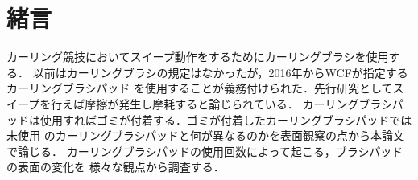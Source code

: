 \documentclass[main]{subfiles}
\begin{document}
\chapter{緒言}
カーリング競技においてスイープ動作をするためにカーリングブラシを使用する．
以前はカーリングブラシの規定はなかったが，2016年からWCFが指定するカーリングブラシパッド
を使用することが義務付けられた．先行研究としてスイープを行えば摩擦が発生し摩耗すると論じられている\cite{ref:maeno2016}．
カーリングブラシパッドは使用すればゴミが付着する．ゴミが付着したカーリングブラシパッドでは未使用
のカーリングブラシパッドと何が異なるのかを表面観察の点から本論文で論じる． 
カーリングブラシパッドの使用回数によって起こる，ブラシパッドの表面の変化を
様々な観点から調査する．
\end{document}
